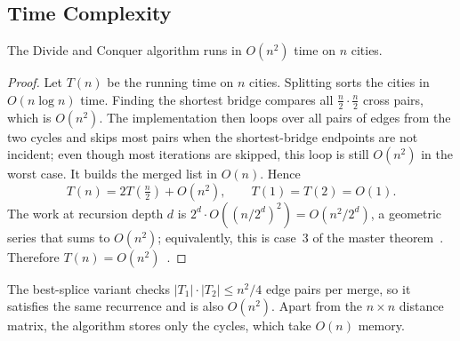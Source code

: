 \subsection{Time Complexity}

\begin{theorem}
The Divide and Conquer algorithm runs in $O(n^2)$ time on $n$ cities.
\end{theorem}
\begin{proof}
Let $T(n)$ be the running time on $n$ cities. Splitting sorts the cities in $O(n\log n)$ time. Finding the
shortest bridge compares all $\frac n2 \cdot \frac n2$ cross pairs, which is $O(n^2)$. The
implementation then loops over all pairs of edges from the two cycles and skips most pairs when the
shortest-bridge endpoints are not incident; even though most iterations are skipped, this loop is still
$O(n^2)$ in the worst case. It builds the merged list in $O(n)$. Hence
\[
  T(n) = 2T\!\left(\tfrac n2\right) + O(n^2), \qquad T(1) = T(2) = O(1).
\]
The work at recursion depth $d$ is $2^d \cdot O\!\left((n/2^d)^2\right) = O(n^2/2^d)$, a geometric series
that sums to $O(n^2)$; equivalently, this is case~3 of the master theorem~\cite{cormen2009introduction}.
Therefore $T(n) = O(n^2)$~\cite{morenomaza_dc}.
\end{proof}

The best-splice variant checks $|T_1|\cdot|T_2| \le n^2/4$ edge pairs per merge, so it satisfies the same
recurrence and is also $O(n^2)$. Apart from the $n\times n$ distance matrix, the algorithm stores only
the cycles, which take $O(n)$ memory.

